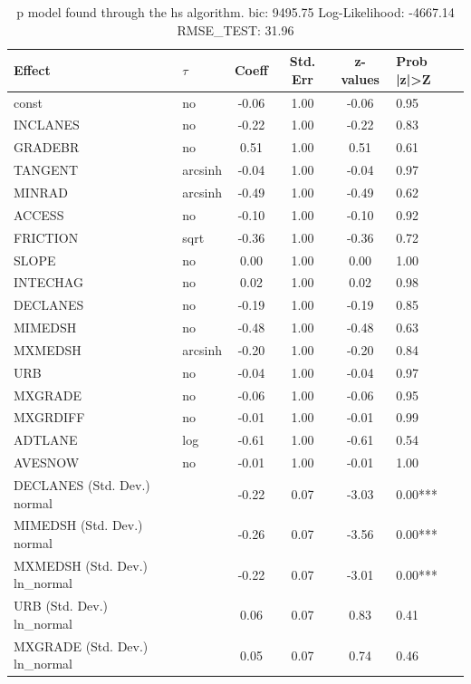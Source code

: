 \begin{table}
	\caption{p model found through the hs algorithm. bic: 9495.75 Log-Likelihood: -4667.14 RMSE_TEST: 31.96}
	\begin{center}
		\begin{tabular}{|l|l|c|c|c|l|}
			\hline
			Effect & $\tau$ & Coeff & Std. Err & z-values & Prob |z|>Z \\
			\hline
			const & no & -0.06 & 1.00 & -0.06 & 0.95 \\
			\hline
			INCLANES & no & -0.22 & 1.00 & -0.22 & 0.83 \\
			\hline
			GRADEBR & no & 0.51 & 1.00 & 0.51 & 0.61 \\
			\hline
			TANGENT & arcsinh & -0.04 & 1.00 & -0.04 & 0.97 \\
			\hline
			MINRAD & arcsinh & -0.49 & 1.00 & -0.49 & 0.62 \\
			\hline
			ACCESS & no & -0.10 & 1.00 & -0.10 & 0.92 \\
			\hline
			FRICTION & sqrt & -0.36 & 1.00 & -0.36 & 0.72 \\
			\hline
			SLOPE & no & 0.00 & 1.00 & 0.00 & 1.00 \\
			\hline
			INTECHAG & no & 0.02 & 1.00 & 0.02 & 0.98 \\
			\hline
			DECLANES & no & -0.19 & 1.00 & -0.19 & 0.85 \\
			\hline
			MIMEDSH & no & -0.48 & 1.00 & -0.48 & 0.63 \\
			\hline
			MXMEDSH & arcsinh & -0.20 & 1.00 & -0.20 & 0.84 \\
			\hline
			URB & no & -0.04 & 1.00 & -0.04 & 0.97 \\
			\hline
			MXGRADE & no & -0.06 & 1.00 & -0.06 & 0.95 \\
			\hline
			MXGRDIFF & no & -0.01 & 1.00 & -0.01 & 0.99 \\
			\hline
			ADTLANE & log & -0.61 & 1.00 & -0.61 & 0.54 \\
			\hline
			AVESNOW & no & -0.01 & 1.00 & -0.01 & 1.00 \\
			\hline
			DECLANES (Std. Dev.) normal &  & -0.22 & 0.07 & -3.03 & 0.00*** \\
			\hline
			MIMEDSH (Std. Dev.) normal &  & -0.26 & 0.07 & -3.56 & 0.00*** \\
			\hline
			MXMEDSH (Std. Dev.) ln_normal &  & -0.22 & 0.07 & -3.01 & 0.00*** \\
			\hline
			URB (Std. Dev.) ln_normal &  & 0.06 & 0.07 & 0.83 & 0.41 \\
			\hline
			MXGRADE (Std. Dev.) ln_normal &  & 0.05 & 0.07 & 0.74 & 0.46 \\

\end{tabular}
\end{center}
\end{table}
